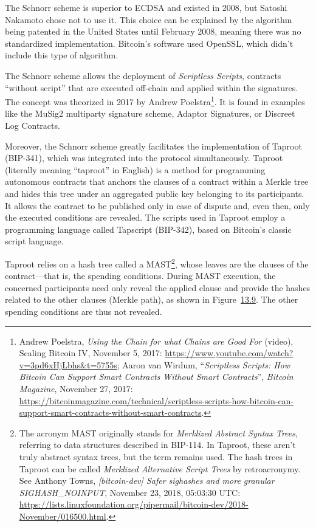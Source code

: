 \documentclass[
  a5paper,
  smalldemyvopaper,10pt,twoside,onecolumn,openright,extrafontsizes,hidelinks]{memoir}
\begin{document}
The Schnorr scheme is superior to ECDSA and existed in 2008, but Satoshi
Nakamoto chose not to use it. This choice can be explained by the
algorithm being patented in the United States until February 2008,
meaning there was no standardized implementation. Bitcoin's software
used OpenSSL, which didn't include this type of algorithm.

The Schnorr scheme allows the deployment of \emph{Scriptless Scripts},
contracts ``without script'' that are executed off-chain and applied
within the signatures. The concept was theorized in 2017 by Andrew
Poelstra\footnote{Andrew Poelstra, \emph{Using the Chain for what Chains
  are Good For} (video), Scaling Bitcoin IV, November 5, 2017:
  \url{https://www.youtube.com/watch?v=3pd6xHjLbhs&t=5755s}; Aaron van
  Wirdum, ``\emph{Scriptless Scripts: How Bitcoin Can Support Smart
  Contracts Without Smart Contracts}'', \emph{Bitcoin Magazine},
  November 27, 2017:
  \url{https://bitcoinmagazine.com/technical/scriptless-scripts-how-bitcoin-can-support-smart-contracts-without-smart-contracts}.}.
It is found in examples like the MuSig2 multiparty signature scheme,
Adaptor Signatures, or Discreet Log Contracts.

Moreover, the Schnorr scheme greatly facilitates the implementation of
Taproot (BIP-341), which was integrated into the protocol
simultaneously. Taproot (literally meaning ``taproot'' in English) is a
method for programming autonomous contracts that anchors the clauses of
a contract within a Merkle tree and hides this tree under an aggregated
public key belonging to its participants. It allows the contract to be
published only in case of dispute and, even then, only the executed
conditions are revealed. The scripts used in Taproot employ a
programming language called Tapscript (BIP-342), based on Bitcoin's
classic script language.

Taproot relies on a hash tree called a MAST\footnote{The acronym MAST
  originally stands for \emph{Merklized Abstract Syntax Trees},
  referring to data structures described in BIP-114. In Taproot, these
  aren't truly abstract syntax trees, but the term remains used. The
  hash trees in Taproot can be called \emph{Merklized Alternative Script
  Trees} by retroacronymy. See Anthony Towns, \emph{{[}bitcoin-dev{]}
  Safer sighashes and more granular SIGHASH\_NOINPUT}, November 23,
  2018, 05:03:30 UTC:
  \url{https://lists.linuxfoundation.org/pipermail/bitcoin-dev/2018-November/016500.html}.},
whose leaves are the clauses of the contract---that is, the spending
conditions. During MAST execution, the concerned participants need only
reveal the applied clause and provide the hashes related to the other
clauses (Merkle path), as shown in
Figure~\hyperref[fig:taproot-mast]{13.9}. The other spending conditions
are thus not revealed.
\end{document}

